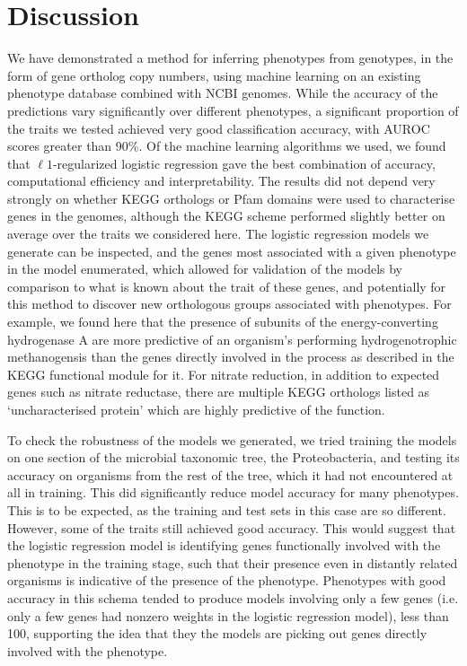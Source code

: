 \documentclass[10pt,letterpaper]{article}
\begin{document}
\section*{Discussion}
We have demonstrated a method for inferring phenotypes from genotypes, in the form of gene ortholog copy numbers, using machine learning on an existing phenotype database combined with NCBI genomes. While the accuracy of the predictions vary significantly over different phenotypes, a significant proportion of the traits we tested achieved very good classification accuracy, with AUROC scores greater than 90\%. Of the machine learning algorithms we used, we found that $\ell1$-regularized logistic regression gave the best combination of accuracy, computational efficiency and interpretability.
The results did not depend very strongly on whether KEGG orthologs or Pfam domains were used to characterise genes in the genomes, although the KEGG scheme performed slightly better on average over the traits we considered here. The logistic regression models we generate can be inspected, and the genes most associated with a given phenotype in the model enumerated, which allowed for validation of the models by comparison to what is known about the trait of these genes, and potentially for this method to discover new orthologous groups associated with phenotypes. For example, we found here that the presence of subunits of the energy-converting hydrogenase A are more predictive of an organism's performing hydrogenotrophic methanogensis than the genes directly involved in the process as described in the KEGG functional module for it. For nitrate reduction, in addition to expected genes such as nitrate reductase, there are multiple KEGG orthologs listed as `uncharacterised protein' which are highly predictive of the function.

To check the robustness of the models we generated, we tried training the models on one section of the microbial taxonomic tree, the Proteobacteria, and testing its accuracy on organisms from the rest of the tree, which it had not encountered at all in training. This did significantly reduce model accuracy for many phenotypes. This is to be expected, as the training and test sets in this case are so different. However, some of the traits still achieved good accuracy. This would suggest that the logistic regression model is identifying genes functionally involved with the phenotype in the training stage, such that their presence even in distantly related organisms is indicative of the presence of the phenotype. Phenotypes with good accuracy in this schema tended to produce models involving only a few genes (i.e. only a few genes had nonzero weights in the logistic regression model), less than 100, supporting the idea that they the models are picking out genes directly involved with the phenotype. %
\end{document}
